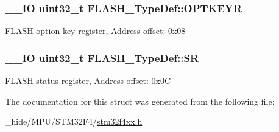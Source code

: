 \subsubsection[{O\+P\+T\+K\+E\+Y\+R}]{\setlength{\rightskip}{0pt plus 5cm}\+\_\+\+\_\+\+I\+O uint32\+\_\+t F\+L\+A\+S\+H\+\_\+\+Type\+Def\+::\+O\+P\+T\+K\+E\+Y\+R}\label{struct_f_l_a_s_h___type_def_a793cd13a4636c9785fdb99316f7fd7ab}
F\+L\+A\+S\+H option key register, Address offset\+: 0x08 \hypertarget{struct_f_l_a_s_h___type_def_a52c4943c64904227a559bf6f14ce4de6}{}
\subsubsection[{S\+R}]{\setlength{\rightskip}{0pt plus 5cm}\+\_\+\+\_\+\+I\+O uint32\+\_\+t F\+L\+A\+S\+H\+\_\+\+Type\+Def\+::\+S\+R}\label{struct_f_l_a_s_h___type_def_a52c4943c64904227a559bf6f14ce4de6}
F\+L\+A\+S\+H status register, Address offset\+: 0x0\+C 

The documentation for this struct was generated from the following file\+:\begin{DoxyCompactItemize}
\item 
\+\_\+hide/\+M\+P\+U/\+S\+T\+M32\+F4/\hyperlink{stm32f4xx_8h}{stm32f4xx.\+h}\end{DoxyCompactItemize}
